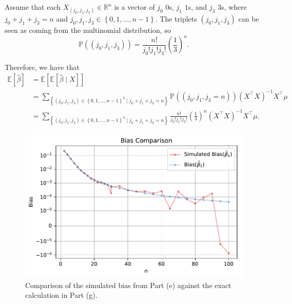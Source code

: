 \documentclass[11pt, letterpaper]{article}
\begin{document}
{\begin{enumerate}[(a)]
\begin{description}
  Assume that each $X_{(j_0,j_1,j_3)} \in \mathbb{R}^n$ is a vector of $j_0$
  $0$s, $j_1$ $1$s, and $j_3$ $3$s, where $j_0 + j_1 + j_3 = n$ and
  $j_0,j_1,j_3 \in \left\{0,1,\ldots, n - 1\right\}$. The triplets $\left(j_0, j_1, j_3\right)$
  can be seen as coming from the multinomial distribution, so
  \begin{equation}
    \mathbb{P}\left(\left(j_0, j_1, j_3\right)\right) = \frac{n!}{j_0!j_1!j_3!}\left(\frac{1}{3}\right)^n.
  \end{equation}

  Therefore, we have that
  \begin{align*}
    \mathbb{E}\left[\hat{\beta}\right]
    &= \mathbb{E}\left[\mathbb{E}\left[
      \hat{\beta}
      \mid X
      \right]\right] \\
    &= \sum_{\left\{
    \left(j_0, j_1, j_3\right) \in \left\{0,1,\ldots, n - 1\right\}^3
      \mid j_0 + j_1 + j_3 = n\right\}}
      \mathbb{P}\left(\left(j_0, j_1, j_3 = n\right)\right)
      \left(X^\intercal X\right)^{-1}X^\intercal \mu \\
    &= \sum_{\left\{
    \left(j_0, j_1, j_3\right) \in \left\{0,1,\ldots, n - 1\right\}^3
      \mid j_0 + j_1 + j_3 = n\right\}}
      \frac{n!}{j_0!j_1!j_3!}\left(\frac{1}{3}\right)^n
      \left(X^\intercal X\right)^{-1}X^\intercal \mu.
  \end{align*}

  \begin{figure}
    \centering
    \includegraphics{p1_bias_comparison}
    \caption{Comparison of the simulated bias from Part (e) against the exact
      calculation in Part (g).}
    \label{fig:p1_bias_comparison}
  \end{figure}
  

\end{description}
\end{enumerate}}
\end{document}
